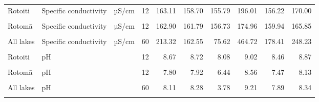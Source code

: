 \documentclass[
  12pt,
  a4paper,
  oneside]{scrbook}
\begin{document}
\begin{longtable}[t]{lllrrrrrrr}
\addlinespace
Rotoiti & Specific conductivity & µS/cm & 12 & 163.11 & 158.70 & 155.79 & 196.01 & 156.22 & 170.00\\
\cellcolor{gray!8}{Rotoehu} & \cellcolor{gray!8}{Specific conductivity} & \cellcolor{gray!8}{µS/cm} & \cellcolor{gray!8}{12} & \cellcolor{gray!8}{458.89} & \cellcolor{gray!8}{458.22} & \cellcolor{gray!8}{455.44} & \cellcolor{gray!8}{464.72} & \cellcolor{gray!8}{456.91} & \cellcolor{gray!8}{460.87}\\
Rotomā & Specific conductivity & µS/cm & 12 & 162.90 & 161.79 & 156.73 & 174.96 & 159.94 & 165.85\\
\cellcolor{gray!8}{Ōkāreka} & \cellcolor{gray!8}{Specific conductivity} & \cellcolor{gray!8}{µS/cm} & \cellcolor{gray!8}{12} & \cellcolor{gray!8}{76.34} & \cellcolor{gray!8}{76.15} & \cellcolor{gray!8}{75.62} & \cellcolor{gray!8}{78.59} & \cellcolor{gray!8}{75.82} & \cellcolor{gray!8}{76.86}\\
All lakes & Specific conductivity & µS/cm & 60 & 213.32 & 162.55 & 75.62 & 464.72 & 178.41 & 248.23\\
\addlinespace
\cellcolor{gray!8}{Rotorua} & \cellcolor{gray!8}{pH} & \cellcolor{gray!8}{} & \cellcolor{gray!8}{12} & \cellcolor{gray!8}{6.94} & \cellcolor{gray!8}{7.04} & \cellcolor{gray!8}{3.78} & \cellcolor{gray!8}{7.69} & \cellcolor{gray!8}{6.29} & \cellcolor{gray!8}{7.60}\\
Rotoiti & pH &  & 12 & 8.67 & 8.72 & 8.08 & 9.02 & 8.46 & 8.87\\
\cellcolor{gray!8}{Rotoehu} & \cellcolor{gray!8}{pH} & \cellcolor{gray!8}{} & \cellcolor{gray!8}{12} & \cellcolor{gray!8}{8.83} & \cellcolor{gray!8}{8.90} & \cellcolor{gray!8}{8.46} & \cellcolor{gray!8}{9.21} & \cellcolor{gray!8}{8.68} & \cellcolor{gray!8}{8.99}\\
Rotomā & pH &  & 12 & 7.80 & 7.92 & 6.44 & 8.56 & 7.47 & 8.13\\
\cellcolor{gray!8}{Ōkāreka} & \cellcolor{gray!8}{pH} & \cellcolor{gray!8}{} & \cellcolor{gray!8}{12} & \cellcolor{gray!8}{8.32} & \cellcolor{gray!8}{8.29} & \cellcolor{gray!8}{7.77} & \cellcolor{gray!8}{9.00} & \cellcolor{gray!8}{8.15} & \cellcolor{gray!8}{8.50}\\
\addlinespace
All lakes & pH &  & 60 & 8.11 & 8.28 & 3.78 & 9.21 & 7.89 & 8.34\\
\cellcolor{gray!8}{Rotorua} & \cellcolor{gray!8}{Presence Catfish} & \cellcolor{gray!8}{} & \cellcolor{gray!8}{12} & \cellcolor{gray!8}{0.08} & \cellcolor{gray!8}{0.00} & \cellcolor{gray!8}{0.00} & \cellcolor{gray!8}{1.00} & \cellcolor{gray!8}{0.00} & \cellcolor{gray!8}{0.38}\\

\end{longtable}
\end{document}
